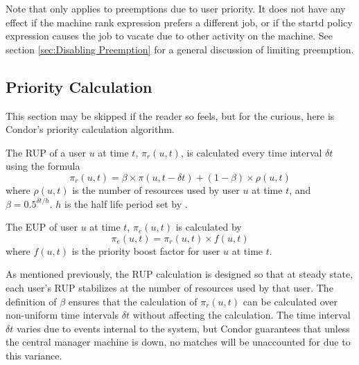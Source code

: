 Note that  only applies to preemptions
due to user priority.  It does not have any effect if the machine rank
expression prefers a different job, or if the startd policy expression
causes the job to vacate due to other activity on the machine.
See section \ref{sec:Disabling Preemption} for a general discussion of
limiting preemption.

\subsection{Priority Calculation}
This section may be skipped if the reader so feels, but for the curious,
here is Condor's priority calculation algorithm.

The RUP of a user $u$ at time $t$, $\pi_r(u,t)$, is calculated 
every time interval $\delta t$ using the formula 
$$\pi_r(u,t) = \beta\times\pi(u,t-\delta t) + (1-\beta)\times\rho(u,t)$$
where $\rho(u,t)$ is the number of resources used by user $u$ at time $t$,
and $\beta=0.5^{{\delta t}/h}$. $h$ is the half life period set by 
.

The EUP of user $u$ at time $t$, $\pi_e(u,t)$
is calculated by
$$\pi_e(u,t) = \pi_r(u,t)\times f(u,t)$$
where $f(u,t)$ is the priority boost factor for user $u$ at time $t$.

As mentioned previously, the RUP calculation is designed so that at steady
state, each user's RUP stabilizes at the number of resources used by that user. 
The definition of $\beta$ ensures that the calculation of $\pi_r(u,t)$ can be 
calculated over non-uniform time intervals $\delta t$ without affecting the 
calculation.  The time interval $\delta t$ varies due to events internal to 
the system, but Condor guarantees that unless the central manager machine is 
down, no matches will be unaccounted for due to this variance.

%  

